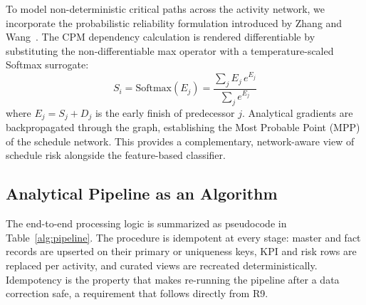 \documentclass[conference]{IEEEtran}
\begin{document}
To model non-deterministic critical paths across the activity network, we incorporate the probabilistic reliability formulation introduced by Zhang and Wang~\cite{zhang2023quantifying}. The CPM dependency calculation is rendered differentiable by substituting the non-differentiable max operator with a temperature-scaled Softmax surrogate:
\begin{equation}
S_i = \text{Softmax}(E_j) = \frac{\sum_j E_j \, e^{E_j}}{\sum_j e^{E_j}}
\label{eq:softmax}
\end{equation}
where \(E_j = S_j + D_j\) is the early finish of predecessor \(j\). Analytical gradients are backpropagated through the graph, establishing the Most Probable Point (MPP) of the schedule network. This provides a complementary, network-aware view of schedule risk alongside the feature-based classifier.

\subsection{Analytical Pipeline as an Algorithm}

The end-to-end processing logic is summarized as pseudocode in Table~\ref{alg:pipeline}. The procedure is idempotent at every stage: master and fact records are upserted on their primary or uniqueness keys, KPI and risk rows are replaced per activity, and curated views are recreated deterministically. Idempotency is the property that makes re-running the pipeline after a data correction safe, a requirement that follows directly from R9.
\end{document}
